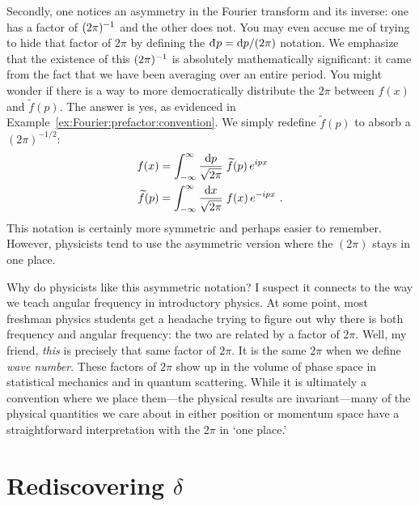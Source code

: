 Secondly, one notices an asymmetry in the Fourier transform and its inverse: one has a factor of $(2\pi)^{-1}$ and the other does not. You may even accuse me of trying to hide that factor of $2\pi$ by defining the $\Dbar{p}=\D{p}/(2\pi)$ notation. We emphasize that the existence of this $(2\pi)^{-1}$ is absolutely mathematically significant: it came from the fact that we have been averaging over an entire period. You might wonder if there is a way to more democratically distribute the $2\pi$ between $f(x)$ and $\tilde f(p)$. The answer is yes, as evidenced in Example~\ref{ex:Fourier:prefactor:convention}. We simply redefine $\tilde f(p)$ to absorb a $(2\pi)^{-1/2}$:
\begin{align}
    f(x) &= 
    \int_{-\infty}^\infty \frac{\operatorname{d}\mkern-3mu^{}\mkern-1mu{p}}{\sqrt{2\pi}}\; 
    \widetilde f(p)\,
    e^{ipx} 
    \label{eq:fourier:transform:convention:even:pi}
\\
    \widetilde f(p) &= 
    \int_{-\infty}^\infty \frac{\operatorname{d}\mkern-3mu^{}\mkern-1mu{x}}{\sqrt{2\pi}}\; 
    f(x)\, e^{-ipx} 
    \ .
    \label{eq:fourier:inverse:transform:convention:even:pi}
\end{align}
This notation is certainly more symmetric and perhaps easier to remember. However, physicists tend to use the asymmetric version where the $(2\pi)$ stays in one place.
\begin{example}
Why do physicists like this asymmetric notation? I suspect it connects to the way we teach angular frequency in introductory physics. At some point, most freshman physics students get a headache trying to figure out why there is both frequency and angular frequency: the two are related by a factor of $2\pi$. Well, my friend, \emph{this} is precisely that same factor of $2\pi$. It is the same $2\pi$ when we define \emph{wave number}. These factors of $2\pi$ show up in the volume of phase space in statistical mechanics and in quantum scattering. While it is ultimately a convention where we place them---the physical results are invariant---many of the physical quantities we care about in either position or momentum space have a straightforward interpretation with the $2\pi$ in `one place.'
\end{example}

\section{\texorpdfstring{Rediscovering $\delta$}{Rediscovering delta}}

